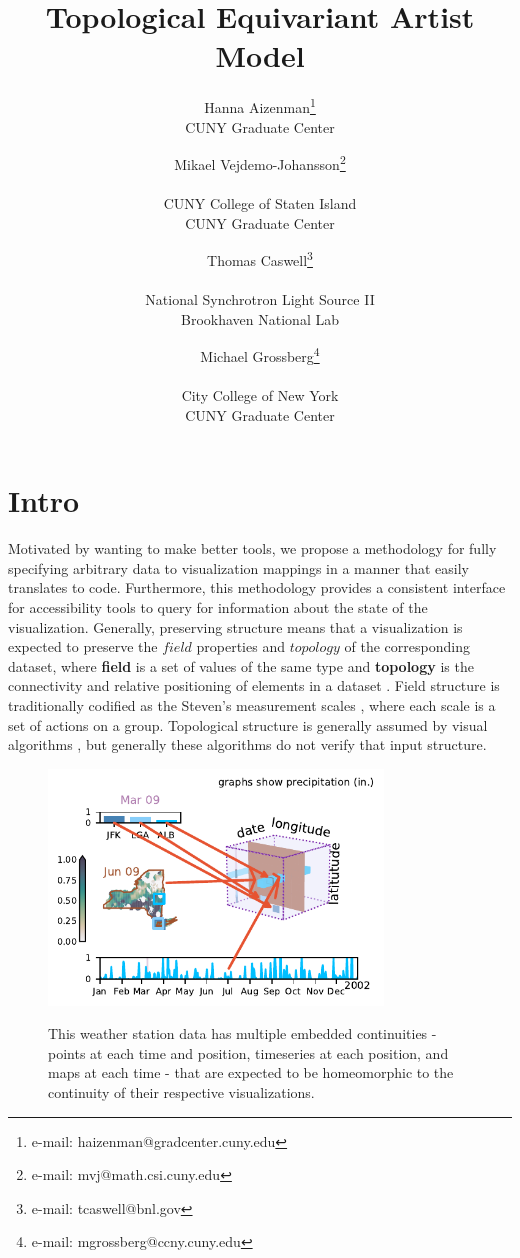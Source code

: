 \documentclass[preprint]{vgtc}
\title{Topological Equivariant Artist Model}
\author{
Hanna Aizenman\thanks{e-mail: haizenman@gradcenter.cuny.edu} \\
\scriptsize{CUNY Graduate Center}
\and
Mikael Vejdemo-Johansson\thanks{e-mail: mvj@math.csi.cuny.edu} \\
\parbox{1.6in}{\scriptsize \centering CUNY College of Staten Island \\
CUNY Graduate Center}
\and
Thomas Caswell\thanks{e-mail: tcaswell@bnl.gov} \\
\parbox{1.8in}{\scriptsize\centering National Synchrotron Light Source II \\ Brookhaven National Lab}
\and
Michael Grossberg\thanks{e-mail: mgrossberg@ccny.cuny.edu} \\
\parbox{1.6in}{\scriptsize\centering City College of New York \\ CUNY Graduate Center}
}
\begin{document}
\maketitle

\section{Intro}
\label{sec:intro}

Motivated by wanting to make better tools, we propose a methodology for fully specifying arbitrary data to visualization mappings in a manner that easily translates to code. Furthermore, this methodology provides a consistent interface for accessibility tools to query for information about the state of the visualization. Generally, preserving structure means that a visualization is expected to preserve the $field$ properties and $topology$ of the corresponding dataset, where \textcolor{fiber}{\textbf{field}} is a set of values of the same type and \textcolor{base}{\textbf{topology}} is the connectivity and relative positioning of elements in a dataset \cite{wilkinsonGrammarGraphics2005}.  Field structure is traditionally codified as the Steven's measurement scales \cite{stevensTheoryScalesMeasurement1946}, where each scale is a set of actions on a group. Topological structure is generally assumed by visual algorithms \cite{chiTaxonomyVisualizationTechniques2000, toryRethinkingVisualizationHighlevel2004}, but generally these algorithms do not verify that input structure.
\begin{figure}[!h]
\begin{center}
    \includegraphics[width=3.5in, alt={Data cube illustrating index space with map, timeseries, and bar charts visualizing slices of the data.}]{k_different_types.pdf}
\end{center}
\caption{This weather station data has multiple embedded continuities - points at each time and position, timeseries at each position, and maps at each time - that are expected to be homeomorphic to the continuity of their respective visualizations.}
    \label{fig:homeomorphism}
\end{figure}
\end{document}
